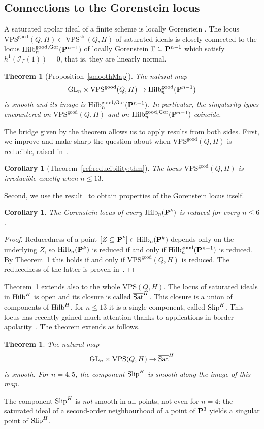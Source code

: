 \documentclass{amsart}
\newcommand{\Hilb}{{\rm{Hilb}}}
\newcommand{\Slip}{{\rm{Slip}}}
\newcommand{\Satbar}{\overline{\rm{Sat}}}
\newcommand{\PP}{{\bf P}}
\newcommand{\cI}{{\mathcal I}}
\newcommand{\Hgood}{\Hilb^{\rm{good}}_{n}(\PP^{n-1})}
\newcommand{\HgoodGor}{\Hilb^{\rm{good}, \rm{Gor}}_{n}(\PP^{n-1})}
\newcommand{\VPSsbl}{{\mathrm{VPS}}^{\mathrm{sbl}}(Q, H)}
\newcommand{\VPSgood}{{\mathrm{VPS}}^{\mathrm{good}}(Q, H)}
\newcommand{\VPS}{\mathrm{VPS}(Q, H)}
\newcommand{\GL}{\mathrm{GL}}%
\newtheorem{theorem}[lemma]{\bf Theorem}
\newtheorem{corollary}[lemma]{\bf Corollary}
\begin{document}
\subsection{Connections to the Gorenstein locus}
A saturated apolar ideal of a finite scheme is locally Gorenstein \cite[Proof of Proposition 2.2]{BB10}.
The locus $\VPSgood\subset \VPSsbl$ of saturated ideals is closely connected to the locus $\HgoodGor$
of locally Gorenstein $\Gamma\subseteq \PP^{n-1}$ which satisfy
$h^1(\cI_{\Gamma}(1)) = 0$, that is, they are linearly
normal.
\begin{theorem}[Proposition~{\ref{smoothMap}}]\label{ref:introSmoothMap:thm}
    The natural map
    \[
        \GL_{n}\times \VPSgood\to \Hgood
    \]
    is smooth and its image
    is $\HgoodGor$. In particular, the singularity types encountered on
    $\VPSgood$ and on $\HgoodGor$ coincide.
\end{theorem}
The bridge given by the theorem allows us to apply results from both sides.
First, we improve and make sharp the question about when $\VPSgood$ is
reducible, raised in~\cite[Theorem~1.3]{RS}.
\begin{corollary}[{Theorem~\ref{ref:reducibility:thm}}]
    The locus $\VPSgood$ is irreducible exactly when $n\leq 13$.
\end{corollary}
Second, we use the result~\cite[Corollary~5.16]{RS} to obtain properties of
the Gorenstein locus itself.
\begin{corollary}
    The Gorenstein locus of every $\Hilb_n(\PP^k)$ is reduced for every $n\leq
    6$.
\end{corollary}
\begin{proof}
    Reducedness of a point $[Z\subseteq \PP^k]\in \Hilb_n(\PP^k)$ depends only
    on the underlying $Z$, so $\Hilb_n(\PP^k)$ is reduced if and only if
    $\Hgood$ is reduced. By Theorem~\ref{ref:introSmoothMap:thm} this holds if
    and only if $\VPSgood$ is reduced. The reducedness of the latter is proven
    in~\cite[Corollaries~5.12 and 5.16]{RS}.
\end{proof}
Theorem~\ref{ref:introSmoothMap:thm} extends also to the whole $\VPS$. The
locus of saturated ideals in $\Hilb^H$ is open and its closure is called
$\Satbar^H$. This closure is a union of components of $\Hilb^H$, for $n\leq 13$ it is a single
component, called $\Slip^H$. This locus has recently gained much attention thanks
to applications in border apolarity~\cite{BB, JM}. The theorem extends as
follows.
\begin{theorem}\label{ref:introSmoothMapWhole:thm}
    The natural map
    \[
        \GL_{n}\times \VPS\to \Satbar^H
    \]
    is smooth.
    For $n=4,5$, the component $\Slip^H$ is smooth along the image of this map.
\end{theorem}
The component $\Slip^H$ is \emph{not} smooth in all points, not even for
$n=4$: the saturated ideal of a second-order neighbourhood of a point of $\PP^3$ yields a singular point of $\Slip^H$.
\end{document}
